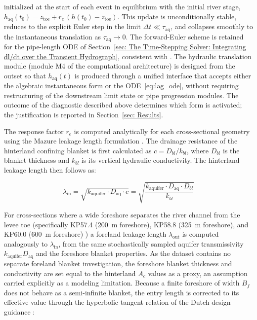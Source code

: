 initialized at the start of each event in equilibrium with the initial river stage,
$h_\mathrm{aq}(t_0) = z_\mathrm{toe} + r_e\,(h(t_0) - z_\mathrm{toe})$. This update is
unconditionally stable, reduces to the explicit Euler step in the limit
$\Delta t \ll \tau_\mathrm{aq}$, and collapses smoothly to the instantaneous translation
as $\tau_\mathrm{aq} \to 0$. The forward-Euler scheme is retained for the pipe-length
ODE of
Section~\ref{sec: The Time-Stepping Solver: Integrating dl/dt over the Transient Hydrograph},
consistent with \textcite{pol_compgeo_2024}. The hydraulic translation module (module M4 of the computational architecture) is designed from the outset so that $h_\mathrm{aq}(t)$ is produced
through a unified interface that accepts either the algebraic instantaneous form or the
ODE~\eqref{eq:lag_ode}, without requiring restructuring of the downstream limit state
or pipe progression modules. The outcome of the diagnostic described above determines
which form is activated; the justification is reported in Section~\ref{sec: Results}.

The response factor $r_e$ is computed analytically for each cross-sectional geometry
using the Mazure leakage length formulation \parencite{pol_sie_2024}. The drainage
resistance of the hinterland confining blanket is first calculated as $c = D_{bl}/k_{bl}$,
where $D_{bl}$ is the blanket thickness and $k_{bl}$ is its vertical hydraulic
conductivity. The hinterland leakage length then follows as:

$$\lambda_\mathrm{in} = \sqrt{k_\mathrm{aquifer} \cdot D_\mathrm{aq} \cdot c}
= \sqrt{\frac{k_\mathrm{aquifer} \cdot D_\mathrm{aq} \cdot D_{bl}}{k_{bl}}}$$

For cross-sections where a wide foreshore separates the river channel from the levee toe (specifically KP57.4 (200~m foreshore), KP58.8 (325~m foreshore), and KP60.0 (600~m foreshore) \parencite{oyo_1999}) a foreland leakage length
$\lambda_\mathrm{out}$ is computed analogously to $\lambda_\mathrm{in}$, from the same stochastically sampled aquifer transmissivity $k_\mathrm{aquifer} D_\mathrm{aq}$ and the foreshore blanket properties. As the \textcite{oyo_1999} dataset contains no separate foreland blanket investigation, the foreshore blanket thickness and conductivity are set equal to the hinterland $A_c$ values as a proxy, an assumption carried explicitly as a modeling limitation. Because a finite foreshore of width $B_f$ does not behave as a semi-infinite blanket, the entry length is corrected to its effective value through the hyperbolic-tangent relation of the Dutch design guidance
\parencite{TRZmw1999, TAW2004}:

